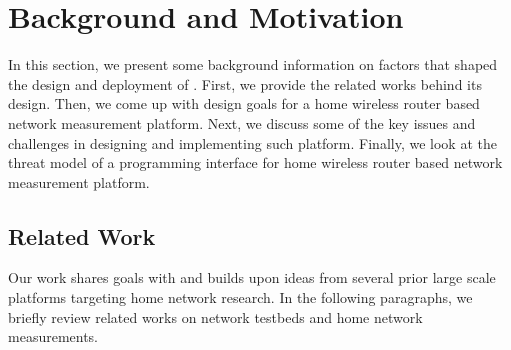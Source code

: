 \chapter{Background and Motivation}
\label{sec.background_motivation}
In this section, we present some background information on factors that shaped the design and deployment of \sysname. First, we provide the related works behind its design. Then, we come up with design goals for a home wireless router based network measurement platform. Next, we discuss some of the key issues and  challenges in designing and implementing such platform. Finally, we look at the threat model of a programming interface for home wireless router based network measurement platform.

\section{Related Work}
\label{ssec.related_work}
Our work shares goals with and builds upon ideas from several prior large scale platforms targeting home network research. In the following paragraphs, we briefly review related works on network testbeds and home network measurements. 

